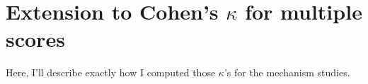 \graphicspath{{appendices/kappa-extension/}}

\chapter{Extension to Cohen's $\kappa$ for multiple scores}

Here, I'll describe exactly how I computed those $\kappa$'s for the mechanism
studies.

